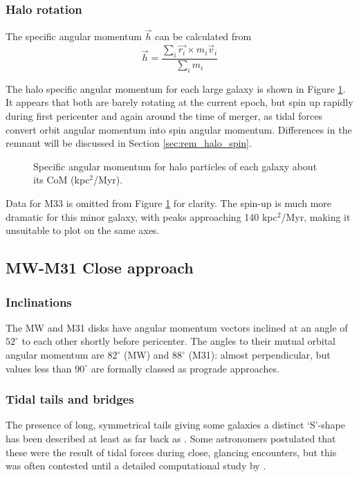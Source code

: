 \documentclass[twocolumn]{aastex63}
\begin{document}
\subsubsection{Halo rotation}

The specific angular momentum $\vec{h}$ can be calculated from
\[ \vec{h} = \frac{\sum_i{\vec{r_i} \times m_i \vec{v}_i}}{\sum_i{m_i}} \]

The halo specific angular momentum for each large galaxy is shown in Figure \ref{fig:halo_h}. It appears that both are barely rotating at the current epoch, but spin up rapidly during first pericenter and again around the time of merger, as tidal forces convert orbit angular momentum into spin angular momentum. Differences in the remnant will be discussed in Section \ref{sec:rem_halo_spin}.

\begin{figure}[htb!]
	\caption{Specific angular momentum for halo particles of each galaxy about its CoM (kpc$^2$/Myr).
		\label{fig:halo_h}}
\end{figure}

Data for M33 is omitted from Figure \ref{fig:halo_h} for clarity. The spin-up is much more dramatic for this minor galaxy, with peaks approaching 140 kpc$^2$/Myr, making it unsuitable to plot on the same axes.

\subsection{MW-M31 Close approach}
\label{sec:close_approach}

\subsubsection{Inclinations}

The MW and M31 disks have angular momentum vectors inclined at an angle of $52^\circ$ to each other shortly before pericenter. The angles to their mutual orbital angular momentum are $82^\circ$ (MW) and $88^\circ$ (M31): almost perpendicular, but values less than $90^\circ$ are formally classed as prograde approaches.

\subsubsection{Tidal tails and bridges}

The presence of long, symmetrical tails giving some galaxies a distinct `S'-shape has been described at least as far back as \citet{zwicky_novel_1955}. Some astronomers postulated that these were the result of tidal forces during close, glancing encounters, but this was often contested until a detailed computational study by \citet{toomre_galactic_1972}.
\end{document}
